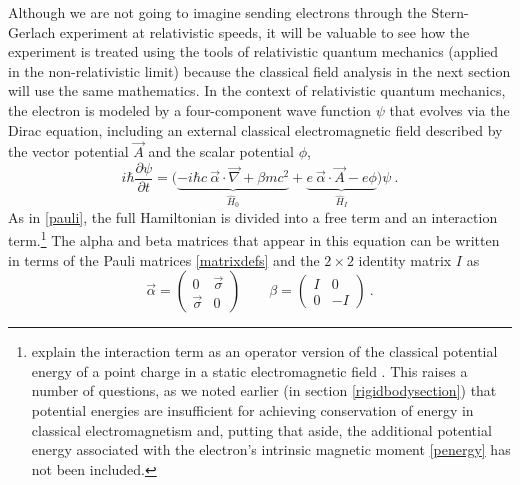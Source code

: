 \documentclass[onecolumn,secnumarabic,amsmath,amssymb,balancelastpage,nofootinbib]{article}
\begin{document}
Although we are not going to imagine sending electrons through the Stern-Gerlach experiment at relativistic speeds, it will be valuable to see how the experiment is treated using the tools of relativistic quantum mechanics (applied in the non-relativistic limit) because the classical field analysis in the next section will use the same mathematics.  In the context of relativistic quantum mechanics, the electron is modeled by a four-component wave function $\psi$ that evolves via the Dirac equation, including an external classical electromagnetic field described by the vector potential $\vec{A}$ and the scalar potential $\phi$,
\begin{equation}
i \hbar \frac{\partial \psi}{\partial t}=\big(\underbrace{-i \hbar c \: \vec{\alpha}\cdot\vec{\nabla} + \beta m c^2}_{\widehat{H}_0} + \underbrace{e\: \vec{\alpha} \cdot \vec{A} - e \phi}_{\widehat{H}_I} \big)\psi
\ .
\label{dirac}
\end{equation}
As in \eqref{pauli}, the full Hamiltonian is divided into a free term and an interaction term.\footnote{\citet[pg.\ 11]{bjorkendrell} explain the interaction term as an operator version of the classical potential energy of a point charge in a static electromagnetic field \citep[sec.\ 15.6]{feynman2}.  This raises a number of questions, as we noted earlier (in section \ref{rigidbodysection}) that potential energies are insufficient for achieving conservation of energy in classical electromagnetism and, putting that aside, the additional potential energy associated with the electron's intrinsic magnetic moment \eqref{penergy} has not been included.}  The alpha and beta matrices that appear in this equation can be written in terms of the Pauli matrices \eqref{matrixdefs} and the $2 \times 2$ identity matrix $I$ as
\begin{equation}
\vec{\alpha}=\left(\begin{matrix} 0&\vec{\sigma}\\ \vec{\sigma}&0 \end{matrix}\right) \quad\quad \beta = \left(\begin{matrix} I&0\\ 0&-I \end{matrix}\right)
\ .
\label{matrixdefs2}
\end{equation}
\end{document}
